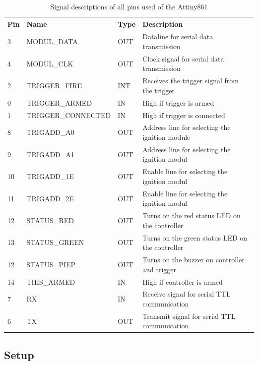 \begin{table}[!ht]
    \centering
	\begin{tabular}{|l|l|l|l|}\hline
Pin & Name               & Type &Description \\ \hline \hline
3   & MODUL\_DATA        & OUT & Dataline for serial data transmission\\ \hline
4   & MODUL\_CLK         & OUT & Clock signal for serial data transmission\\ \hline
2   & TRIGGER\_FIRE      & INT & Receives the trigger signal from the trigger\\ \hline
0   & TRIGGER\_ARMED     & IN & High if trigger is armed\\ \hline
1   & TRIGGER\_CONNECTED & IN & High if trigger is connected           \\ \hline
8   & TRIGADD\_A0        & OUT & Address line for selecting the ignition module\\ \hline
9   & TRIGADD\_A1        & OUT & Address line for selecting the ignition modul\\ \hline
10  & TRIGADD\_1E        & OUT & Enable line for selecting the ignition modul\\ \hline
11  & TRIGADD\_2E        & OUT & Enable line for selecting the ignition modul\\ \hline
12  & STATUS\_RED        & OUT & Turns on the red status LED on the controller\\ \hline
13  & STATUS\_GREEN      & OUT & Turns on the green status LED on the controller\\ \hline
12  & STATUS\_PIEP       & OUT & Turns on the buzzer on controller and trigger\\ \hline
14  & THIS\_ARMED        & IN & High if controller is armed\\ \hline
7   & RX                 & IN & Receive signal for serial TTL communication\\ \hline
6   & TX                 & OUT & Transmit signal for serial TTL communication\\ \hline
	\end{tabular}
	\caption{Signal descriptions of all pins used of the Attiny861}
	\label{tab:pinio}
\end{table}

\pagebreak

\subsection{Setup}


